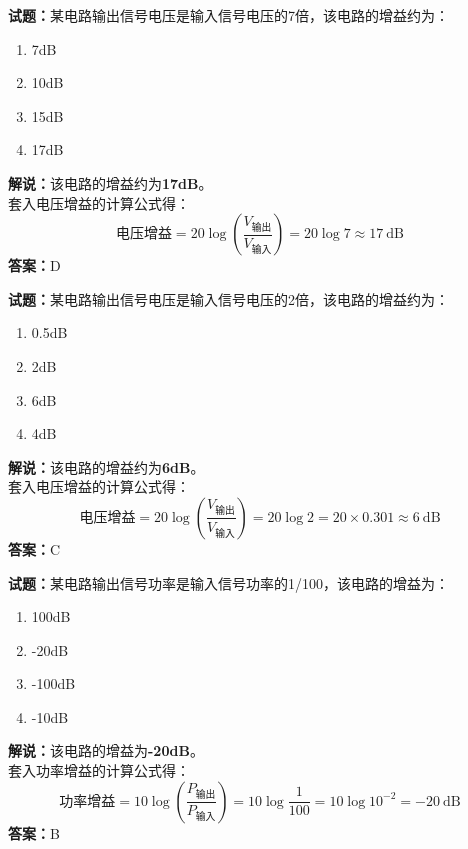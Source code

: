 \documentclass{ctexbook}
\begin{document}
\bigskip

\noindent\textbf{试题：}某电路输出信号电压是输入信号电压的7倍，该电路的增益约为：
\begin{enumerate}[leftmargin=3em]
	\item 7dB
	\item 10dB
	\item 15dB
	\item 17dB%
\end{enumerate}
\noindent\textbf{解说：}该电路的增益约为\textbf{17dB}。\\
套入电压增益的计算公式得：
$$\mbox{电压增益}=20 \log \left( {\frac{V_{ \mbox{输出} }}{V_{ \mbox{输入} }}} \right)=20 \log 7 \approx17 \ \mathrm{dB}$$
\noindent\textbf{答案：}D



\bigskip


\noindent\textbf{试题：}某电路输出信号电压是输入信号电压的2倍，该电路的增益约为：
\begin{enumerate}[leftmargin=3em]
\item 0.5dB
\item 2dB
\item 6dB
\item 4dB
\end{enumerate}
\noindent\textbf{解说：}该电路的增益约为\textbf{6dB}。\\
套入电压增益的计算公式得：
$$\mbox{电压增益}=20 \log \left( {\frac{V_{ \mbox{输出} }}{V_{ \mbox{输入} }}} \right)=20 \log 2 = 20 \times 0.301 \approx 6 \ \mathrm{dB}$$
\noindent\textbf{答案：}C





\bigskip


\noindent\textbf{试题：}某电路输出信号功率是输入信号功率的1/100，该电路的增益为：
\begin{enumerate}[leftmargin=3em]
\item 100dB
\item -20dB
\item -100dB
\item -10dB
\end{enumerate}
\noindent\textbf{解说：}该电路的增益为\textbf{-20dB}。\\
套入功率增益的计算公式得：
$$\mbox{功率增益}=10 \log \left( {\frac{P_{ \mbox{输出} }}{P_{ \mbox{输入} }}} \right)=10 \log \frac{1}{100}=10 \log 10^{-2}=-20 \ \mathrm{dB}$$
\noindent\textbf{答案：}B
\end{document}
